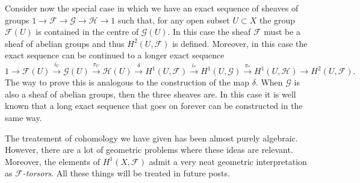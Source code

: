 \documentclass[12pt,a4paper]{article}
\begin{document}
	      Consider now the special case in which we have an exact sequence of sheaves of groups $1\rightarrow \mathcal{F} \rightarrow \mathcal{G} \rightarrow \mathcal{H} \rightarrow 1$ such that, for any open subset $U \subset X$ the group $\mathcal{F}(U)$ is contained in the centre of $\mathcal{G}(U)$. In this case the sheaf $\mathcal{F}$ must be a sheaf of abelian groups and thus $H^2(U,\mathcal{F})$ is defined. Moreover, in this case the exact sequence can be continued to a longer exact sequence
	    \begin{equation*}
	      1\rightarrow \mathcal{F}(U) \overset{i_U}{\rightarrow} \mathcal{G}(U) \overset{\pi_U}{\rightarrow} \mathcal{H}(U) \overset{\delta}{\rightarrow} H^1(U,\mathcal{F}) \overset{i_*}{\rightarrow} H^1(U,\mathcal{G}) \overset{\pi_*}{\rightarrow} H^1(U,\mathcal{H}) \rightarrow H^2(U,\mathcal{F}).
	    \end{equation*}
	    The way to prove this is analogous to the construction of the map $\delta$.
When $\mathcal{G}$ is also a sheaf of abelian groups, then the three sheaves are. In this case it is well known that a long exact sequence that goes on forever can be constructed in the same way.

The treatement of cohomology we have given has been almost purely algebraic. However, there are a lot of geometric problems where these ideas are relevant. Moreover, the elements of $H^1(X,\mathcal{F})$ admit a very neat geometric interpretation as \emph{$\mathcal{F}$-torsors}. All these things will be treated in future posts.
\end{document}
